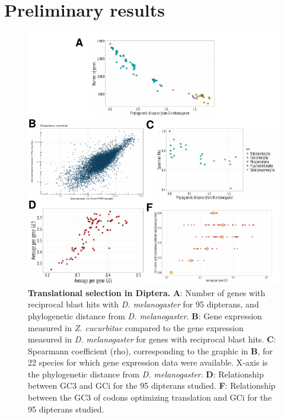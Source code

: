 
\chapter{Preliminary results}

{\hypersetup{linkcolor=GREYDARK}\minilof\newpage}

\graphicspath{{chap7-Translational Selection/figures/}}


\begin{figure}[t]
    \centering                                                                            
    \includegraphics[width=\textwidth] {figures/Appen_C1.pdf}                                               
    \caption[Translational selection in Diptera]{\textbf{Translational selection in Diptera.} \textbf{A}: Number of genes with reciprocal blast hits with \textit{D. melanogaster} for 95 dipterans, and phylogenetic distance from \textit{D. melanogaster}. \textbf{B}: Gene expression measured in \textit{Z. cucurbitae} compared to the gene expression measured in \textit{D. melanogaster} for genes with reciprocal blast hits. \textbf{C}: Spearmann coefficient (rho), corresponding to the graphic in \textbf{B}, for 22 species for which gene expression data were available. X-axis is the phylogenetic distance from \textit{D. melanogaster}. \textbf{D}: Relationship between GC3 and GCi for the 95 dipterans studied. \textbf{F}: Relationship between the GC3 of codons optimizing translation and GCi for the 95 dipterans studied.}
    \label{suppfig:AppC1}
\end{figure}


